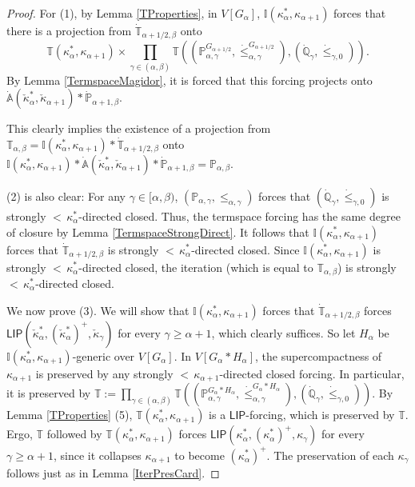 \documentclass[a4paper]{amsart}
\theoremstyle{definition}
\theoremstyle{remark}
\theoremstyle{plain}
\numberwithin{mydef}{section}
\newcommand{\dA}{\mathbb{A}}
\newcommand{\dI}{\mathbb{I}}
\newcommand{\dP}{\mathbb{P}}
\newcommand{\dQ}{\mathbb{Q}}
\newcommand{\dT}{\mathbb{T}}
\newcommand{\LIP}{\mathsf{LIP}}
\begin{document}
	\begin{proof}
		For (1), by Lemma \ref{TProperties}, in $V[G_{\alpha}]$, $\dI(\kappa_{\alpha}^*,\kappa_{\alpha+1})$ forces that there is a projection from $\dot{\dT}_{\alpha+1/2,\beta}$ onto $$\dT(\kappa_{\alpha}^*,\kappa_{\alpha+1})\times\prod_{\gamma\in(\alpha,\beta)}\dT((\dP_{\alpha,\gamma}^{G_{\alpha+1/2}},\dot{\leq}_{\alpha,\gamma}^{G_{\alpha+1/2}}),(\dot{\dQ}_{\gamma},\dot{\leq}_{\gamma,0})).$$
		By Lemma \ref{TermspaceMagidor}, it is forced that this forcing projects onto $\dot{\dA}(\check{\kappa}_{\alpha}^*,\check{\kappa}_{\alpha+1})*\dot{\dP}_{\alpha+1,\beta}$.
		
		This clearly implies the existence of a projection from $\dT_{\alpha,\beta}=\dI(\kappa_{\alpha}^*,\kappa_{\alpha+1})*\dot{\dT}_{\alpha+1/2,\beta}$ onto $\dI(\kappa_{\alpha}^*,\kappa_{\alpha+1})*\dot{\dA}(\check{\kappa}_{\alpha}^*,\check{\kappa}_{\alpha+1})*\dot{\dP}_{\alpha+1,\beta}=\dP_{\alpha,\beta}$.
		
		(2) is also clear: For any $\gamma\in[\alpha,\beta)$, $(\dP_{\alpha,\gamma},\leq_{\alpha,\gamma})$ forces that $(\dot{\dQ}_{\gamma},\dot{\leq}_{\gamma,0})$ is strongly ${<}\,\kappa_{\alpha}^*$-directed closed. Thus, the termspace forcing has the same degree of closure by Lemma \ref{TermspaceStrongDirect}. It follows that $\dI(\kappa_{\alpha}^*,\kappa_{\alpha+1})$ forces that $\dot{\dT}_{\alpha+1/2,\beta}$ is strongly ${<}\,\kappa_{\alpha}^*$-directed closed. Since $\dI(\kappa_{\alpha}^*,\kappa_{\alpha+1})$ is strongly ${<}\,\kappa_{\alpha}^*$-directed closed, the iteration (which is equal to $\dT_{\alpha,\beta}$) is strongly ${<}\,\kappa_{\alpha}^*$-directed closed.
		
		We now prove (3). We will show that $\dI(\kappa_{\alpha}^*,\kappa_{\alpha+1})$ forces that $\dot{\dT}_{\alpha+1/2,\beta}$ forces $\LIP(\check{\kappa}_{\alpha}^*,(\check{\kappa}_{\alpha}^*)^+,\check{\kappa}_{\gamma})$ for every $\gamma\geq\alpha+1$, which clearly suffices. So let $H_{\alpha}$ be $\dI(\kappa_{\alpha}^*,\kappa_{\alpha+1})$-generic over $V[G_{\alpha}]$. In $V[G_{\alpha}*H_{\alpha}]$, the supercompactness of $\kappa_{\alpha+1}$ is preserved by any strongly ${<}\,\kappa_{\alpha+1}$-directed closed forcing. In particular, it is preserved by $\dT:=\prod_{\gamma\in(\alpha,\beta)}\dT((\dP_{\alpha,\gamma}^{G_{\alpha}*H_{\alpha}},\dot{\leq}_{\alpha,\gamma}^{G_{\alpha}*H_{\alpha}}),(\dot{\dQ}_{\gamma},\dot{\leq}_{\gamma,0}))$. By Lemma \ref{TProperties} (5),  $\dT(\kappa_{\alpha}^*,\kappa_{\alpha+1})$ is a $\LIP$-forcing, which is preserved by $\dT$. Ergo, $\dT$ followed by $\dT(\kappa_{\alpha}^*,\kappa_{\alpha+1})$ forces $\LIP(\kappa_{\alpha}^*,(\kappa_{\alpha}^*)^+,\kappa_{\gamma})$ for every $\gamma\geq\alpha+1$, since it collapses $\kappa_{\alpha+1}$ to become $(\kappa_{\alpha}^*)^+$. The preservation of each $\kappa_{\gamma}$ follows just as in Lemma \ref{IterPresCard}.
	\end{proof}
		
\end{document}
